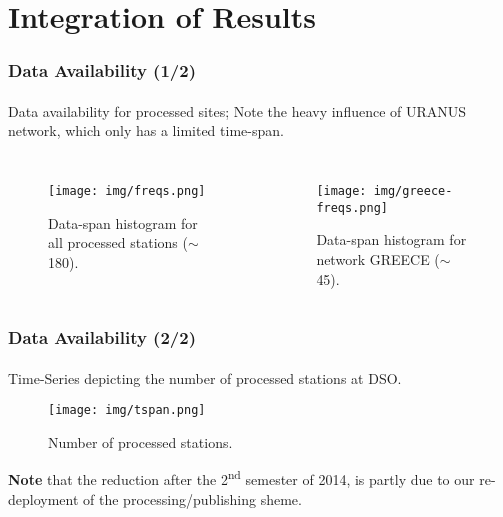 \documentclass{beamer}
\begin{document}
\section{Integration of Results}

\begin{frame}\frametitle{Data Availability (1/2)}\framesubtitle{}

Data availability for processed sites; Note the heavy influence of URANUS network,
which only has a limited time-span.

  \begin{columns}
    \begin{figure}
        \begin{center}
        \texttt{[image: img/freqs.png]}
        \caption{Data-span histogram for all processed stations ($\sim$180).}
        \label{fig:mits}
        \end{center}
    \end{figure}
    \begin{figure}
        \begin{center}
        \texttt{[image: img/greece-freqs.png]}
        \caption{Data-span histogram for network GREECE ($\sim$45).}
        \label{fig:mits}
        \end{center}
    \end{figure}
  \end{columns}

\end{frame}

\begin{frame}\frametitle{Data Availability (2/2)}\framesubtitle{}

    Time-Series depicting the number of processed stations at DSO.

    \begin{figure}
        \begin{center}
        \texttt{[image: img/tspan.png]}
        \caption{Number of processed stations.}
        \label{fig:mits}
        \end{center}
    \end{figure}

    \textbf{Note} that the reduction after the 2\textsuperscript{nd} semester of 2014, is partly
    due to our re-deployment of the processing/publishing sheme.

\end{frame}
\end{document}
